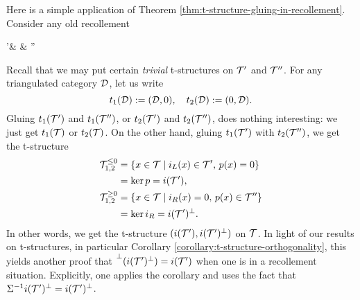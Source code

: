 \begin{example}
	Here is a simple application of Theorem \ref{thm:t-structure-gluing-in-recollement}. Consider any old recollement
	\begin{diagram*}[column sep=large]
		\calT'\ar[r,"i" description,""{below,name=A},""{above,name=AA}] &
			\calT \ar[r,"p" description,""{below,name=C},""{above,name=CC}]\ar[l,bend left,shift left,"i_R",""{above,name=B}]\ar[l,bend right,shift right,"i_L"',""{below,name=BB}] &
			\calT'' \ar[l,bend left,shift left,"p_R",""{above,name=D}]\ar[l,bend right,shift right,"p_L"',""{below,name=DD}]
			\ar[from=B,to=A,symbol=\vdash]\ar[from=D,to=C,symbol=\vdash]
			\ar[from=AA,to=BB,symbol=\vdash]\ar[from=CC,to=DD,symbol=\vdash]
	\end{diagram*}
	Recall that we may put certain \emph{trivial} t-structures on \(\mathcal{T}'\) and \(\mathcal{T}''\). For any triangulated category \(\mathcal{D}\), let us write
	\[ t_1(\mathcal{D}) := (\mathcal{D},0),\quad t_2(\mathcal{D}) := (0,\mathcal{D}). \]
	Gluing \(t_1(\mathcal{T}')\) and \(t_1(\mathcal{T}'')\), or \(t_2(\mathcal{T}')\) and \(t_2(\mathcal{T}'')\), does nothing interesting: we just get \(t_1(\mathcal{T})\) or \(t_2(\mathcal{T})\).
	On the other hand, gluing \(t_1(\mathcal{T}')\) with \(t_2(\mathcal{T}'')\), we get the t-structure
	\begin{align*}
		\mathcal{T}^{\leq 0}_{1,2} &= \{ x\in\mathcal{T} \mid i_L(x)\in\mathcal{T}',\, p(x) = 0 \} \\
		&= \ker{p} = i(\mathcal{T}'),\\
		\mathcal{T}^{\geq 0}_{1,2} &= \{ x\in\mathcal{T} \mid i_R(x) = 0,\, p(x)\in\mathcal{T}'' \} \\
		&= \ker{i_R} = i(\mathcal{T}')^\perp.
	\end{align*}
	In other words, we get the t-structure \((i(\mathcal{T}'),i(\mathcal{T}')^\perp)\) on \(\mathcal{T}\). In light of our results on t-structures, in particular Corollary \ref{corollary:t-structure-orthogonality},
	this yields another proof that \(\prescript{\perp}{}{(i(\ensuremath{\mathcal{T}}')^\perp)} = i(\mathcal{T}')\) when one is in a recollement situation. Explicitly, one applies the corollary and uses the fact
	that \(\Sigma^{-1}i(\mathcal{T}')^\perp = i(\mathcal{T}')^\perp\).
\end{example}

